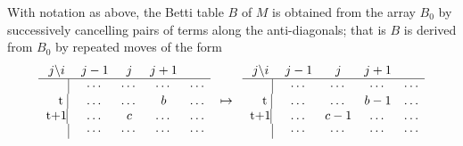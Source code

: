 \begin{proposition}\cite{Peeva}\label{cancellation}
With notation as above, the Betti table $B$ of $M$ is obtained from the array $B_{0}$ by successively cancelling pairs of terms along the anti-diagonals; that is $B$ is derived from $B_{0}$ by repeated moves of the form
\begin{align*}
\begin{matrix}
j \backslash i     &j-1&j&j+1\\ \hline
\text{\kern 19pt}\vline &\cdots&\cdots&\cdots&\cdots\\
\text{ \kern 7pt t }\vline &\dots&\dots&b&\dots\\
\text{t+1}\vline &\dots&c&\dots&\dots\\
\text{\kern 19pt}\vline &\cdots&\cdots&\cdots&\cdots\\
\end{matrix}
\quad \mapsto\quad
\begin{matrix}
j \backslash i     &j-1&j&j+1\\ \hline
\text{\kern 19pt}\vline &\cdots&\cdots&\cdots&\cdots\\
\text{ \kern 7pt t }\vline &\dots&\dots&b-1&\dots\\
\text{t+1}\vline &\dots&c-1&\dots&\dots\\
\text{\kern 19pt}\vline &\cdots&\cdots&\cdots&\cdots\\
\end{matrix}
\end{align*}
\end{proposition}

